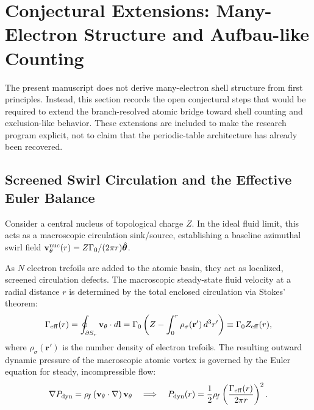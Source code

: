 \documentclass[11pt,a4paper]{article}
\begin{document}
    \section{Conjectural Extensions: Many-Electron Structure and Aufbau-like Counting}
    \label{sec:MultiElectronShells}
    
    The present manuscript does not derive many-electron shell structure from first principles. Instead, this section records the open conjectural steps that would be required to extend the branch-resolved atomic bridge toward shell counting and exclusion-like behavior. These extensions are included to make the research program explicit, not to claim that the periodic-table architecture has already been recovered.
    
    \subsection{Screened Swirl Circulation and the Effective Euler Balance}
        Consider a central nucleus of topological charge $Z$. In the ideal fluid limit, this acts as a macroscopic circulation sink/source, establishing a baseline azimuthal swirl field $\mathbf{v}_{\theta}^{\rm nuc}(r) = Z \Gamma_0 / (2\pi r) \hat{\boldsymbol{\theta}}$.
        
        As $N$ electron trefoils are added to the atomic basin, they act as localized, screened circulation defects. The macroscopic steady-state fluid velocity at a radial distance $r$ is determined by the total enclosed circulation via Stokes' theorem:
        \begin{equation}
            \label{eq:GammaEff}
            \Gamma_{\rm eff}(r) = \oint_{\partial S_r} \mathbf{v}_{\theta} \cdot d\mathbf{l} = \Gamma_0 \left( Z - \int_0^r \rho_\sigma(\mathbf{r}') \, d^3r' \right) \equiv \Gamma_0 Z_{\rm eff}(r),
        \end{equation}
        where $\rho_\sigma(\mathbf{r}')$ is the number density of electron trefoils. The resulting outward dynamic pressure of the macroscopic atomic vortex is governed by the Euler equation for steady, incompressible flow:
        \begin{equation}
            \label{eq:EulerDynamicPressure}
            \nabla P_{\rm dyn} = \rho_{\!f} \left( \mathbf{v}_{\theta} \cdot \nabla \right) \mathbf{v}_{\theta} \quad \Longrightarrow \quad P_{\rm dyn}(r) = \frac{1}{2}\rho_{\!f} \left( \frac{\Gamma_{\rm eff}(r)}{2\pi r} \right)^2.
        \end{equation}
    
\end{document}
